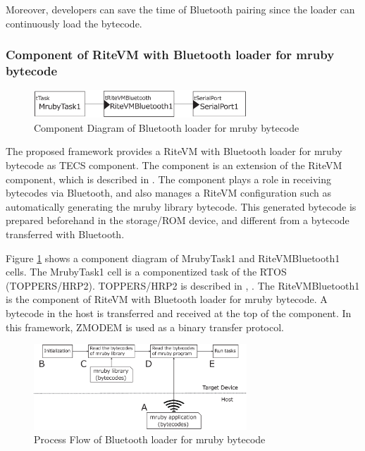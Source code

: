 \documentclass{sig-alternate-05-2015}
\begin{document}
Moreover, developers can save the time of Bluetooth pairing since the loader can continuously load the bytecode.


\subsubsection{Component of RiteVM with Bluetooth loader for mruby bytecode}
\begin{figure}[t]
    \centering
    \includegraphics[width=8cm,clip]{figure/component_bluetooth.eps}
    \vspace{1mm}
\caption{Component Diagram of Bluetooth loader for mruby bytecode}
    \vspace{1mm}
\label{fig:component_bluetooth}
\end{figure}
The proposed framework provides a RiteVM with Bluetooth loader for mruby bytecode as TECS component.
The component is an extension of the RiteVM component, which is described in \cite{par:mrubyonTECS}.
The component plays a role in receiving bytecodes via Bluetooth, and also manages a RiteVM configuration such as automatically generating the mruby library bytecode.
This generated bytecode is prepared beforehand in the storage/ROM device, and different from a bytecode transferred with Bluetooth.

Figure \ref{fig:component_bluetooth} shows a component diagram of MrubyTask1 and RiteVMBluetooth1 {\myit cell}s.
The MrubyTask1 {\myit cell} is a componentized task of the RTOS (TOPPERS/HRP2).
TOPPERS/HRP2 is described in \cite{url:HRP2}, \cite{par:hr-tecs}.
The RiteVMBluetooth1 is the component of RiteVM with Bluetooth loader for mruby bytecode.
A bytecode in the host is transferred and received at the top of the component.
In this framework, ZMODEM \cite{par:zmodem} is used as a binary transfer protocol.

\begin{figure}[t]
    \centering
    \includegraphics[width=8cm,clip]{figure/control_flow.eps}
    \vspace{1mm}
\caption{Process Flow of Bluetooth loader for mruby bytecode}
    \vspace{1mm}
\label{fig:control_flow}
\end{figure}
\end{document}
